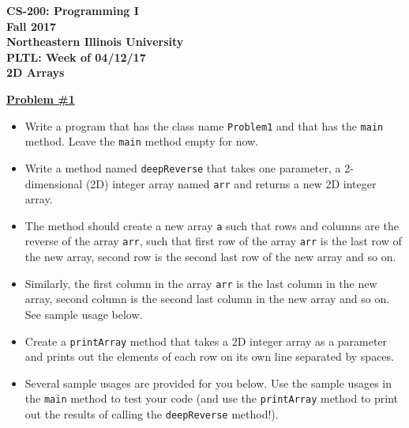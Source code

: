 \documentclass[12pt]{article}
\begin{document}
\begin{center}
	\textbf{CS-200: Programming I}\\
	\textbf{Fall 2017}\\
	\textbf{Northeastern Illinois University}\\
	\textbf{PLTL: Week of 04/12/17}\\
	\textbf{2D Arrays}
\end{center}


\noindent\underline{\textbf{Problem \#1}}
\begin{itemize}
	\item Write a program that has the class name \texttt{Problem1} and that has the \texttt{main} method. Leave the \texttt{main} method empty for now.
	\item Write a method named \texttt{deepReverse} that takes one parameter, a 2-dimensional (2D) integer array named \texttt{arr} and returns a new 2D integer array.
	\item The method should create a new array \texttt{a} such that rows and columns are the reverse of the array \texttt{arr}, such that first row of the array \texttt{arr} is the last row of the new array, second row is the second last row of the new array and so on.  
	\item Similarly, the first column in the array \texttt{arr} is the last column in the new array, second column is the second last column in the new array and so on. See sample usage below.
	\item Create a \texttt{printArray} method that takes a 2D integer array as a parameter and prints out the elements of each row on its own line separated by spaces.
	\item Several sample usages are provided for you below. Use the sample usages in the \texttt{main} method to test your code (and use the \texttt{printArray} method to print out the results of calling the \texttt{deepReverse} method!).
\end{itemize}
\end{document}
